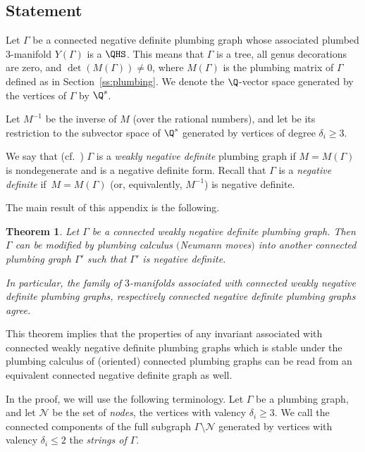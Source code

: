 \documentclass[pdftex]{sigma}
\newtheorem{Theorem}{Theorem}[section]
\begin{document}
\subsection{Statement} Let $\Gamma$ be a connected negative definite plumbing graph whose associated plumbed 3-manifold $Y(\Gamma)$ is a $\QHS$. This means that $\Gamma$ is a tree, all genus decorations are zero, and $\det(M(\Gamma))\not=0$, where $M(\Gamma)$ is the plumbing matrix of $\Gamma$
 defined as in Section~\ref{ss:plumbing}. We denote the $\Q$-vector space generated by the vertices of $\Gamma$ by
 $\Q^s$.

 Let $M^{-1}$ be the inverse of $M$ (over the rational numbers), and let 
 be its restriction to the subvector space of $\Q^s$ generated by vertices of degree $\delta_i\geq 3$.

We say that (cf.~\cite[Definition~4.3]{GM21}) $\Gamma$ is a \emph{weakly negative definite} plumbing graph
if ${M\!=\!M(\Gamma)}$ is nondegenerate and  is a negative definite form.
Recall that $\Gamma$ is a {\it negative definite }
if~${M=M(\Gamma)}$ \big(or, equivalently, $M^{-1}$\big) is negative definite.

The main result of this appendix is the following.

\begin{Theorem}\label{th:app}
Let $\Gamma$ be a connected weakly negative definite plumbing graph. Then $\Gamma$ can be modified
 by plumbing calculus $($Neumann moves$)$ into another connected plumbing graph $\Gamma'$ such that
$\Gamma'$ is negative definite.

In particular, the family of $3$-manifolds associated with connected weakly negative definite plumbing graphs, respectively connected negative definite plumbing graphs agree.
\end{Theorem}

This theorem implies that the properties of any invariant associated with connected weakly negative definite plumbing graphs which is stable under the plumbing calculus of (oriented) connected plumbing graphs can be read from an equivalent
connected negative definite graph as well.

In the proof, we will use the following terminology.
Let $\Gamma$ be a plumbing graph, and let $\mathcal{N}$ be the set of \emph{nodes}, the vertices with valency $\delta_i\geq 3$. We call the connected components of the
full subgraph $\Gamma\setminus \mathcal{N}$
generated by vertices with valency $\delta_i\leq 2$ the \emph{strings of $\Gamma$}.
\end{document}
